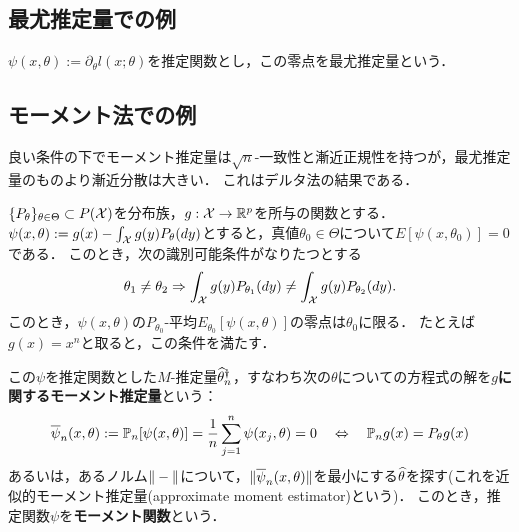 \documentclass[uplatex,dvipdfmx]{jsreport}
\begin{document}
\subsection{最尤推定量での例}

\begin{tcolorbox}[colframe=ForestGreen, colback=ForestGreen!10!white,breakable,colbacktitle=ForestGreen!40!white,coltitle=black,fonttitle=\bfseries\sffamily,
title=]
    $\psi(x,\theta):=\partial_\theta l(x;\theta)$を推定関数とし，この零点を最尤推定量という．
\end{tcolorbox}

\begin{theorem}[最尤推定量の漸近正規性の十分条件]\label{thm-ASN-of-MLE}
    
\end{theorem}

\subsection{モーメント法での例}

\begin{tcolorbox}[colframe=ForestGreen, colback=ForestGreen!10!white,breakable,colbacktitle=ForestGreen!40!white,coltitle=black,fonttitle=\bfseries\sffamily,
title=]
    良い条件の下でモーメント推定量は$\sqrt{n}$-一致性と漸近正規性を持つが，最尤推定量のものより漸近分散は大きい．
    これはデルタ法の結果である．
\end{tcolorbox}

\begin{notation}
    $\{P_\theta\}_{\theta\in\Theta}\subset P(\mathcal{X})$を分布族，$g:\mathcal{X}\to\mathbb{R}^p$を所与の関数とする．
    $\psi(x,\theta):=g(x)-\int_{\mathcal{X}} g(y)P_\theta(dy)$とすると，真値$\theta_0\in\Theta$について$E[\psi(x,\theta_0)]=0$である．
    このとき，次の識別可能条件がなりたつとする
    \[\theta_1\ne\theta_2\Rightarrow\int_{\mathcal{X}} g(y)P_{\theta_1}(dy)\ne\int_{\mathcal{X}} g(y)P_{\theta_2}(dy).\]
    このとき，$\psi(x,\theta)$の$P_{\theta_0}$-平均$E_{\theta_0}[\psi(x,\theta)]$の零点は$\theta_0$に限る．
    たとえば$g(x)=x^n$と取ると，この条件を満たす．
\end{notation}

\begin{definition}
    この$\psi$を推定関数とした$M$-推定量$\widehat{\theta}^\dagger_n$，すなわち次の$\theta$についての方程式の解を\textbf{$g$に関するモーメント推定量}という：
    \[\overline{\psi}_n(x,\theta):=\mathbb{P}_n[\psi(x,\theta)]=\frac{1}{n}\sum_{j=1}^n\psi(x_j,\theta)=0\quad\Leftrightarrow\quad \mathbb{P}_ng(x)=P_\theta g(x)\]
    あるいは，あるノルム$\|-\|$について，$\|\overline{\psi}_n(x,\theta)\|$を最小にする$\widehat{\theta}$を探す(これを近似的モーメント推定量(approximate moment estimator)という)．
    このとき，推定関数$\psi$を\textbf{モーメント関数}という．
\end{definition}
\end{document}
